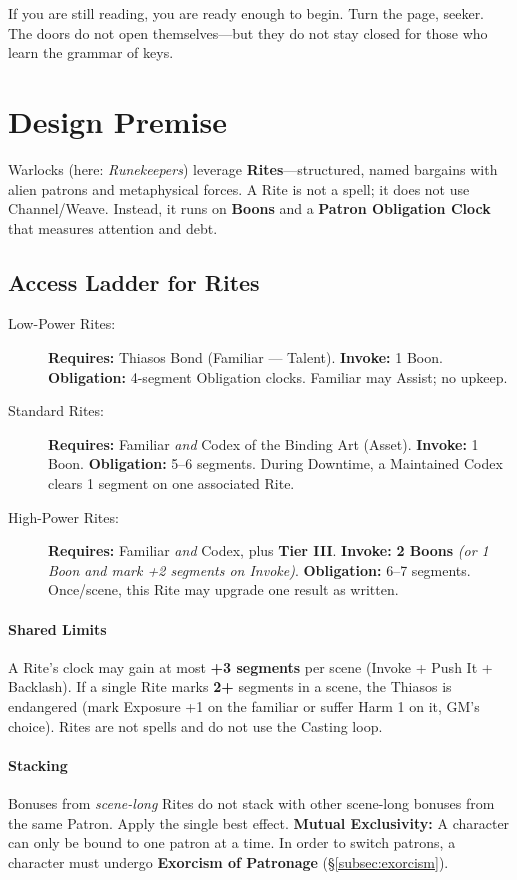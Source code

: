 \documentclass[12pt,twoside]{book}
\begin{document}
If you are still reading, you are ready enough to begin. Turn the page, seeker. The doors do not open themselves—but they do not stay closed for those who learn the grammar of keys.

\section{Design Premise}
Warlocks (here: \emph{Runekeepers}) leverage \textbf{Rites}---structured, named bargains with alien patrons and metaphysical forces. A Rite is not a spell; it does not use Channel/Weave. Instead, it runs on \textbf{Boons} and a \textbf{Patron Obligation Clock} that measures attention and debt.

\subsection*{Access Ladder for Rites}
\begin{description}
  \item[Low-Power Rites:] \textbf{Requires:} Thiasos Bond (Familiar — Talent). \textbf{Invoke:} 1 Boon. \textbf{Obligation:} 4-segment Obligation clocks. Familiar may Assist; no upkeep.
  \item[Standard Rites:] \textbf{Requires:} Familiar \emph{and} Codex of the Binding Art (Asset). \textbf{Invoke:} 1 Boon. \textbf{Obligation:} 5–6 segments. During Downtime, a Maintained Codex clears 1 segment on one associated Rite.
  \item[High-Power Rites:] \textbf{Requires:} Familiar \emph{and} Codex, plus \textbf{Tier III}. \textbf{Invoke:} \textbf{2 Boons} \emph{(or 1 Boon and mark +2 segments on Invoke)}. \textbf{Obligation:} 6–7 segments. Once/scene, this Rite may upgrade one result as written.
\end{description}

\paragraph{Shared Limits}
A Rite’s clock may gain at most \textbf{+3 segments} per scene (Invoke + Push It + Backlash). If a single Rite marks \textbf{2+} segments in a scene, the Thiasos is endangered (mark Exposure +1 on the familiar or suffer Harm 1 on it, GM’s choice). Rites are not spells and do not use the Casting loop.

\paragraph{Stacking}
Bonuses from \emph{scene-long} Rites do not stack with other scene-long bonuses from the same Patron. Apply the single best effect.
\textbf{Mutual Exclusivity:} A character can only be bound to one patron at a time. In order to switch patrons, a character must undergo \textbf{Exorcism of Patronage} (\S\ref{subsec:exorcism}).
\end{document}
